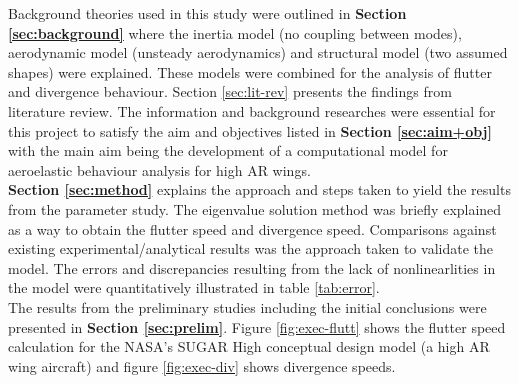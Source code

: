 \documentclass[11pt]{article}
\begin{document}
Background theories used in this study were outlined in \textbf{Section \ref{sec:background}} where the inertia model (no coupling between modes), aerodynamic model (unsteady aerodynamics) and structural model (two assumed shapes) were explained. These models were combined for the analysis of flutter and divergence behaviour. Section \ref{sec:lit-rev} presents the findings from literature review. The information and background researches were essential for this project to satisfy the aim and objectives listed in \textbf{Section \ref{sec:aim+obj}} with the main aim being the development of a computational model for aeroelastic behaviour analysis for high AR wings. \\

\textbf{Section \ref{sec:method}} explains the approach and steps taken to yield the results from the parameter study. The eigenvalue solution method was briefly explained as a way to obtain the flutter speed and divergence speed. Comparisons against existing experimental/analytical results was the approach taken to validate the model. The errors and discrepancies resulting from the lack of nonlinearlities in the model were quantitatively illustrated in table \ref{tab:error}.\\

The results from the preliminary studies including the initial conclusions were presented in \textbf{Section \ref{sec:prelim}}. Figure \ref{fig:exec-flutt} shows the flutter speed calculation for the NASA's SUGAR High conceptual design model (a high AR wing aircraft) and figure \ref{fig:exec-div} shows divergence speeds. 
\end{document}
